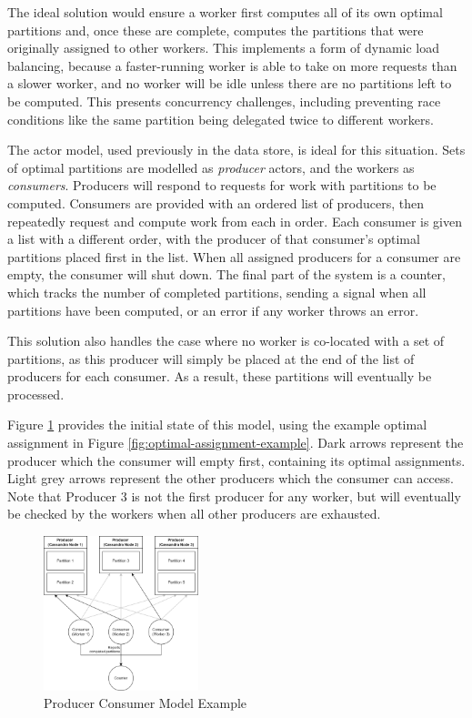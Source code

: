 The ideal solution would ensure a worker first computes all of its own optimal partitions and, once these are complete, computes the partitions that were originally assigned to other workers. This implements a form of dynamic load balancing, because a faster-running worker is able to take on more requests than a slower worker, and no worker will be idle unless there are no partitions left to be computed. This presents concurrency challenges, including preventing race conditions like the same partition being delegated twice to different workers.

The actor model, used previously in the data store, is ideal for this situation. Sets of optimal partitions are modelled as \textit{producer} actors, and the workers as \textit{consumers}. Producers will respond to requests for work with partitions to be computed. Consumers are provided with an ordered list of producers, then repeatedly request and compute work from each in order. Each consumer is given a list with a different order, with the producer of that consumer's optimal partitions placed first in the list. When all assigned producers for a consumer are empty, the consumer will shut down.  The final part of the system is a counter, which tracks the number of completed partitions, sending a signal when all partitions have been computed, or an error if any worker throws an error.

This solution also handles the case where no worker is co-located with a set of partitions, as this producer will simply be placed at the end of the list of producers for each consumer. As a result, these partitions will eventually be processed.

Figure \ref{fig:producer-consumer-model-example} provides the initial state of this model, using the example optimal assignment in Figure \ref{fig:optimal-assignment-example}. Dark arrows represent the producer which the consumer will empty first, containing its optimal assignments. Light grey arrows represent the other producers which the consumer can access. Note that Producer 3 is not the first producer for any worker, but will eventually be checked by the workers when all other producers are exhausted.

\begin{figure}[h]
	\centering
	\includegraphics[width=0.4\textwidth]{chapters/diagrams/implementation/producer-consumer-model-example}
	\caption{Producer Consumer Model Example}
	\label{fig:producer-consumer-model-example}
\end{figure}

